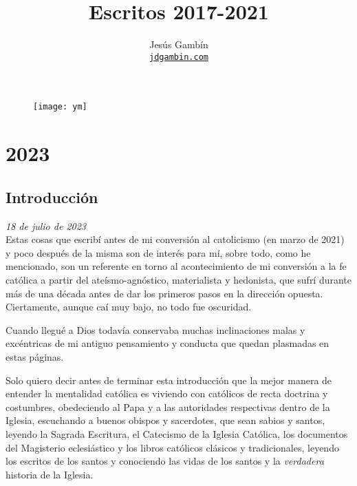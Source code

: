 \documentclass[12pt]{article}
\title
{
	Escritos 2017-2021\\\vspace{0.5cm}
}
\author
{
	Jesús Gambín\\
	\normalsize{
		\texttt{\href{https://jdgambin.github.io}{jdgambin.com}}
	}
	\\\vspace{-1cm}
}
\date{}
\begin{document}
	\maketitle

	\begin{figure}[ht]
		\centering
		\texttt{[image: ym]}
	\end{figure}

	\vspace{0.8cm}

	\newpage

	\tableofcontents

	\newpage

	\section{2023}

	\subsection{Introducción}

	\textit{18 de julio de 2023}\\

	Estas cosas que escribí antes de mi conversión al catolicismo (en marzo
	de 2021) y poco después de la misma son de interés
	 para mí, sobre todo, como he mencionado, son un
	referente en torno al acontecimiento de mi conversión a la fe católica a
	partir del ateísmo-agnóstico, materialista y hedonista, que sufrí
	durante más de una década antes de dar los primeros pasos en la
	dirección opuesta. Ciertamente, aunque caí muy bajo, no todo fue
	oscuridad.

	Cuando llegué a Dios todavía conservaba muchas inclinaciones malas y
	excéntricas de mi antiguo pensamiento y conducta que quedan plasmadas en
	estas páginas.

	Solo quiero decir antes de terminar esta introducción que la mejor
	manera de entender la mentalidad católica es viviendo con católicos de
	recta doctrina y costumbres, obedeciendo al Papa y a las autoridades
	respectivas dentro de la Iglesia, escuchando a buenos obispos y
	sacerdotes, que sean sabios y santos, leyendo la Sagrada Escritura, el
	Catecismo de la Iglesia Católica, los documentos del Magisterio
	eclesiástico y los libros católicos clásicos y tradicionales, leyendo 
	los escritos
	de los santos y conociendo las vidas de los santos y la
	\textit{verdadera} historia de la Iglesia.
\end{document}
